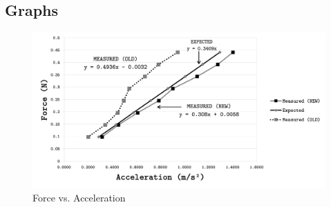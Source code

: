 

\begin{landscape}
\subsection{Graphs}
\begin{figure}[H]
	\begin{center}
		\captionsetup{font=Large}
		\caption{Force vs. Acceleration}\label{fig:GFvA}
		\includegraphics[width=0.90\columnwidth]{images/GraphFvA}
	\end{center}
\end{figure}
\end{landscape}


\newpage

